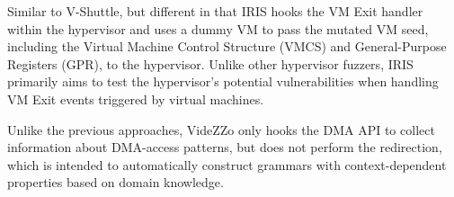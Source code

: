 Similar to V-Shuttle, but different in that IRIS hooks the VM Exit handler within the hypervisor and uses a dummy VM to pass the mutated VM seed, including the Virtual Machine Control Structure (VMCS) and General-Purpose Registers (GPR), to the hypervisor. Unlike other hypervisor fuzzers, IRIS primarily aims to test the hypervisor's potential vulnerabilities when handling VM Exit events triggered by virtual machines.

Unlike the previous approaches, VideZZo only hooks the DMA API to collect information about DMA-access patterns, but does not perform the redirection, which is intended to automatically construct grammars with context-dependent properties based on domain knowledge.